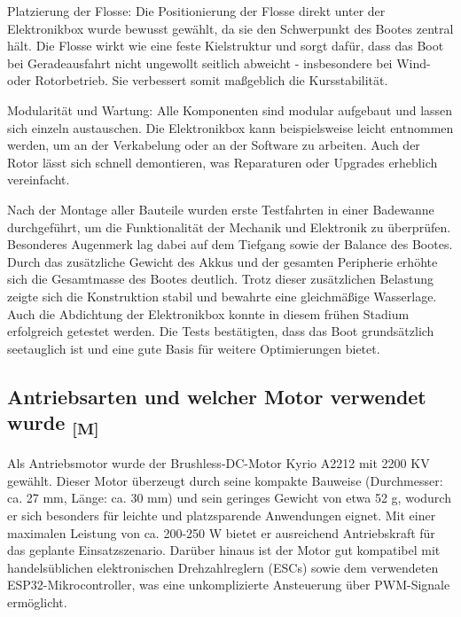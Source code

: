 \documentclass[a4paper,12pt]{article}
\begin{document}
Platzierung der Flosse: Die Positionierung der Flosse direkt unter der Elektronikbox wurde bewusst gewählt, da sie den Schwerpunkt des Bootes zentral hält. Die Flosse wirkt wie eine feste Kielstruktur und sorgt dafür, dass das Boot bei Geradeausfahrt nicht ungewollt seitlich abweicht - insbesondere bei Wind- oder Rotorbetrieb. Sie verbessert somit maßgeblich die Kursstabilität.\newline

Modularität und Wartung: Alle Komponenten sind modular aufgebaut und lassen sich einzeln austauschen. Die Elektronikbox kann beispielsweise leicht entnommen werden, um an der Verkabelung oder an der Software zu arbeiten. Auch der Rotor lässt sich schnell demontieren, was Reparaturen oder Upgrades erheblich vereinfacht.


Nach der Montage aller Bauteile wurden erste Testfahrten in einer Badewanne durchgeführt, um die Funktionalität der Mechanik und Elektronik zu überprüfen. Besonderes Augenmerk lag dabei auf dem Tiefgang sowie der Balance des Bootes. Durch das zusätzliche Gewicht des Akkus und der gesamten Peripherie erhöhte sich die Gesamtmasse des Bootes deutlich. Trotz dieser zusätzlichen Belastung zeigte sich die Konstruktion stabil und bewahrte eine gleichmäßige Wasserlage. Auch die Abdichtung der Elektronikbox konnte in diesem frühen Stadium erfolgreich getestet werden. Die Tests bestätigten, dass das Boot grundsätzlich seetauglich ist und eine gute Basis für weitere Optimierungen bietet.



\newpage
\subsection{\texorpdfstring{Antriebsarten und welcher Motor verwendet wurde \textsubscript{[M]}}{Antriebsarten und welcher Motor verwendet wurde [M]}}

Als Antriebsmotor wurde der Brushless-DC-Motor Kyrio A2212 mit 2200 KV gewählt. Dieser Motor überzeugt durch seine kompakte Bauweise (Durchmesser: ca. 27 mm, Länge: ca. 30 mm) und sein geringes Gewicht von etwa 52 g, wodurch er sich besonders für leichte und platzsparende Anwendungen eignet. Mit einer maximalen Leistung von ca. 200-250 W bietet er ausreichend Antriebskraft für das geplante Einsatzszenario. Darüber hinaus ist der Motor gut kompatibel mit handelsüblichen elektronischen Drehzahlreglern (ESCs) sowie dem verwendeten ESP32-Mikrocontroller, was eine unkomplizierte Ansteuerung über PWM-Signale ermöglicht.\cite{Datenblatt_Brushlessmotor}
\end{document}
